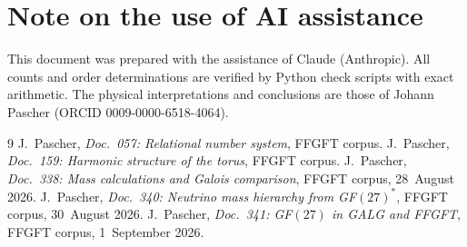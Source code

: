 \section*{Note on the use of AI assistance}

This document was prepared with the assistance of Claude (Anthropic). All counts
and order determinations are verified by Python check scripts with exact
arithmetic. The physical interpretations and conclusions are those of
Johann Pascher (ORCID 0009-0000-6518-4064).

\begin{thebibliography}{9}
 J.~Pascher, \textit{Doc.~057: Relational number system}, FFGFT corpus.
 J.~Pascher, \textit{Doc.~159: Harmonic structure of the torus}, FFGFT corpus.
 J.~Pascher, \textit{Doc.~338: Mass calculations and Galois comparison}, FFGFT corpus, 28~August 2026.
 J.~Pascher, \textit{Doc.~340: Neutrino mass hierarchy from GF$(27)^*$}, FFGFT corpus, 30~August 2026.
 J.~Pascher, \textit{Doc.~341: GF$(27)$ in GALG and FFGFT}, FFGFT corpus, 1~September 2026.
\end{thebibliography}
